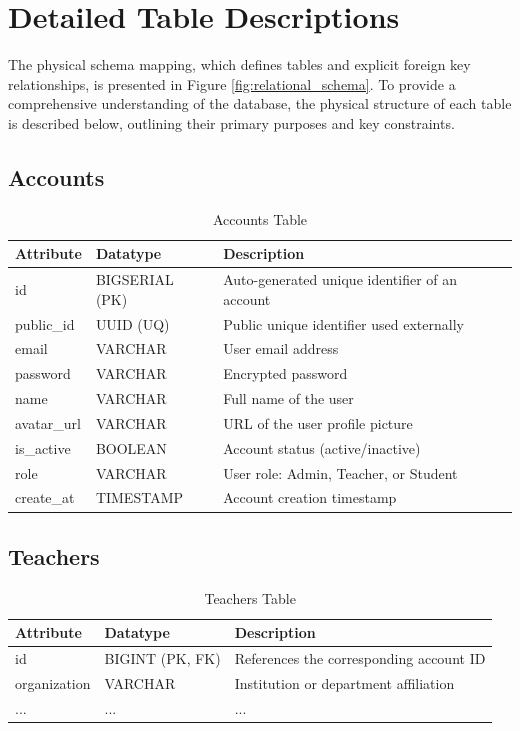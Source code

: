 \documentclass[../report_main.tex]{subfiles}
\begin{document}
\section{Detailed Table Descriptions}
The physical schema mapping, which defines tables and explicit foreign key relationships, is presented in Figure \ref{fig:relational_schema}. To provide a comprehensive understanding of the database, the physical structure of each table is described below, outlining their primary purposes and key constraints.

\subsection{Accounts}
\begin{table}[H]
\centering
\caption{Accounts Table}
\label{tab:accounts}
\renewcommand{\arraystretch}{1.25}
\begin{tabular}{|p{3cm}|p{3.5cm}|p{8.5cm}|}
\hline
\textbf{Attribute} & \textbf{Datatype} & \textbf{Description} \\ \hline
id & BIGSERIAL (PK) & Auto-generated unique identifier of an account \\ \hline
public\_id & UUID (UQ) & Public unique identifier used externally \\ \hline
email & VARCHAR & User email address \\ \hline
password & VARCHAR & Encrypted password \\ \hline
name & VARCHAR & Full name of the user \\ \hline
avatar\_url & VARCHAR & URL of the user profile picture \\ \hline
is\_active & BOOLEAN & Account status (active/inactive) \\ \hline
role & VARCHAR & User role: Admin, Teacher, or Student \\ \hline
create\_at & TIMESTAMP & Account creation timestamp \\ \hline
\end{tabular}
\end{table}

\subsection{Teachers}
\begin{table}[H]
\centering
\caption{Teachers Table}
\label{tab:teachers}
\renewcommand{\arraystretch}{1.25}
\begin{tabular}{|p{3cm}|p{3.5cm}|p{8.5cm}|}
\hline
\textbf{Attribute} & \textbf{Datatype} & \textbf{Description} \\ \hline
id & BIGINT (PK, FK) & References the corresponding account ID \\ \hline
organization & VARCHAR & Institution or department affiliation \\ \hline
... & ... & ... \\ \hline
\end{tabular}
\end{table}
\end{document}
